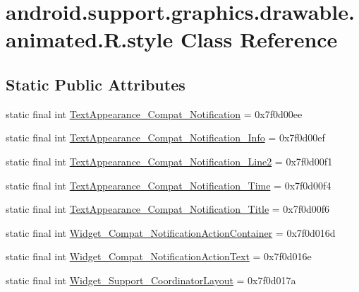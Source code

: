 \hypertarget{classandroid_1_1support_1_1graphics_1_1drawable_1_1animated_1_1_r_1_1style}{}\section{android.\+support.\+graphics.\+drawable.\+animated.\+R.\+style Class Reference}
\label{classandroid_1_1support_1_1graphics_1_1drawable_1_1animated_1_1_r_1_1style}
\subsection*{Static Public Attributes}
\begin{DoxyCompactItemize}
\item 
static final int \mbox{\hyperlink{classandroid_1_1support_1_1graphics_1_1drawable_1_1animated_1_1_r_1_1style_a5fbf409dd199cb4a5f5e0dd365563637}{Text\+Appearance\+\_\+\+Compat\+\_\+\+Notification}} = 0x7f0d00ee
\item 
static final int \mbox{\hyperlink{classandroid_1_1support_1_1graphics_1_1drawable_1_1animated_1_1_r_1_1style_a9888e3ca28c5c922d8191265537cdee0}{Text\+Appearance\+\_\+\+Compat\+\_\+\+Notification\+\_\+\+Info}} = 0x7f0d00ef
\item 
static final int \mbox{\hyperlink{classandroid_1_1support_1_1graphics_1_1drawable_1_1animated_1_1_r_1_1style_acc09f6bec13b1b6d745cc94d33c60718}{Text\+Appearance\+\_\+\+Compat\+\_\+\+Notification\+\_\+\+Line2}} = 0x7f0d00f1
\item 
static final int \mbox{\hyperlink{classandroid_1_1support_1_1graphics_1_1drawable_1_1animated_1_1_r_1_1style_ad9a14440bdc4d883c4c8168134762062}{Text\+Appearance\+\_\+\+Compat\+\_\+\+Notification\+\_\+\+Time}} = 0x7f0d00f4
\item 
static final int \mbox{\hyperlink{classandroid_1_1support_1_1graphics_1_1drawable_1_1animated_1_1_r_1_1style_a0daa87e285ed4fa5a17e16b5344ba6f2}{Text\+Appearance\+\_\+\+Compat\+\_\+\+Notification\+\_\+\+Title}} = 0x7f0d00f6
\item 
static final int \mbox{\hyperlink{classandroid_1_1support_1_1graphics_1_1drawable_1_1animated_1_1_r_1_1style_a00f50b1fa159647522db8b2b82ada84b}{Widget\+\_\+\+Compat\+\_\+\+Notification\+Action\+Container}} = 0x7f0d016d
\item 
static final int \mbox{\hyperlink{classandroid_1_1support_1_1graphics_1_1drawable_1_1animated_1_1_r_1_1style_ace24247cc6875b00f9146446714a1736}{Widget\+\_\+\+Compat\+\_\+\+Notification\+Action\+Text}} = 0x7f0d016e
\item 
static final int \mbox{\hyperlink{classandroid_1_1support_1_1graphics_1_1drawable_1_1animated_1_1_r_1_1style_ac8e8534d89e4b29ea3a9f34f37f559b2}{Widget\+\_\+\+Support\+\_\+\+Coordinator\+Layout}} = 0x7f0d017a
\end{DoxyCompactItemize}
